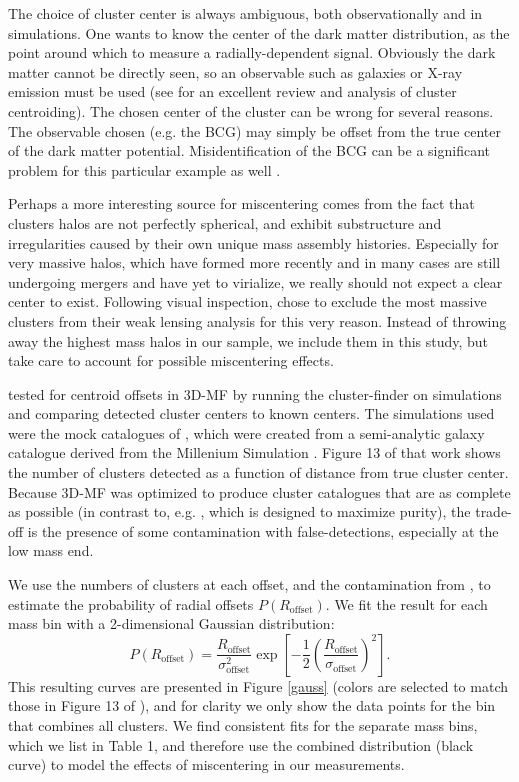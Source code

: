 The choice of cluster center is always ambiguous, both observationally and in simulations. One wants to know the center of the dark matter distribution, as the point around which to measure a radially-dependent signal. Obviously the dark matter cannot be directly seen, so an observable such as galaxies or X-ray emission must be used (see \citet{George12} for an excellent review and analysis of cluster centroiding). The chosen center of the cluster can be wrong for several reasons. The observable chosen (e.g. the BCG) may simply be offset from the true center of the dark matter potential. Misidentification of the BCG can be a significant problem for this particular example as well \citep{Johnston07}. 

Perhaps a more interesting source for miscentering comes from the fact that clusters halos are not perfectly spherical, and exhibit substructure and irregularities caused by their own unique mass assembly histories. Especially for very massive halos, which have formed more recently and in many cases are still undergoing mergers and have yet to virialize, we really should not expect a clear center to exist. Following visual inspection, \citet{Mandelbaum08b} chose to exclude the most massive clusters from their weak lensing analysis for this very reason. Instead of throwing away the highest mass halos in our sample, we include them in this study, but take care to account for possible miscentering effects. 

\citet{Milkeraitis10} tested for centroid offsets in \ac{3D-MF} by running the cluster-finder on simulations and comparing detected cluster centers to known centers. The simulations used were the mock catalogues of \citet{KW07}, which were created from a semi-analytic galaxy catalogue \citep{DeLucia07} derived from the Millenium Simulation \citep{Springel05}. Figure 13 of that work shows the number of clusters detected as a function of distance from true cluster center. Because \ac{3D-MF} was optimized to produce cluster catalogues that are as complete as possible (in contrast to, e.g. \citet{Gillis11}, which is designed to maximize purity), the trade-off is the presence of some contamination with false-detections, especially at the low mass end.

We use the numbers of clusters at each offset, and the contamination from \citet{Milkeraitis10}, to estimate the probability of radial offsets $P(R_{\mathrm{offset}})$. We fit the result for each mass bin with a 2-dimensional Gaussian distribution:
\begin{equation}
P(R_{\mathrm{offset}}) = \frac{R_{\mathrm{offset}}}{\sigma_{\mathrm{offset}}^2} \exp \left[ -\frac{1}{2}\left( \frac{R_{\mathrm{offset}}}{\sigma_{\mathrm{offset}}} \right)^2 \right].
\label{PofRc}
\end{equation}
This resulting curves are presented in Figure \ref{gauss} (colors are selected to match those in Figure 13 of \citet{Milkeraitis10}), and for clarity we only show the data points for the bin that combines all clusters. We find consistent fits for the separate mass bins, which we list in Table 1, and therefore use the combined distribution (black curve) to model the effects of miscentering in our measurements.


